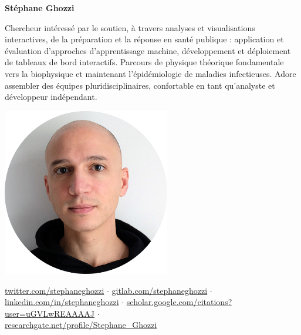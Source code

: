 \documentclass[a4paper,11pt,oneside]{article}
\begin{document}

\noindent\begin{minipage}{0.7\linewidth}
   \LARGE
   \noindent\textbf{Stéphane Ghozzi}

   \normalsize
   \vspace{1.5em}
   \noindent Chercheur intéressé par le soutien, à travers analyses et visualisations interactives, de la préparation et la réponse en santé publique : application et évaluation d'approches d'apprentissage machine, développement et déploiement de tableaux de bord interactifs. Parcours de physique théorique fondamentale vers la biophysique et maintenant l'épidémiologie de maladies infectieuses. Adore assembler des équipes pluridisciplinaires, confortable en tant qu'analyste et développeur indépendant.
\end{minipage}
\begin{minipage}{0.3\linewidth}
   \begin{center}
      \includegraphics[width=0.55\textwidth,right]{GHOZZI-Stephane-portrait-2020-cropped-circle-nobackground-lr.png}
   \end{center}
\end{minipage} 

\vspace{1em}

\href{https://twitter.com/stephaneghozzi}{twitter.com/stephaneghozzi} $\cdot$ \href{https://gitlab.com/stephaneghozzi}{gitlab.com/stephaneghozzi} $\cdot$ \\ \href{https://www.linkedin.com/in/stephaneghozzi}{linkedin.com/in/stephaneghozzi} $\cdot$ \href{https://scholar.google.com/citations?user=uGVLwREAAAAJ}{scholar.google.com/citations?user=uGVLwREAAAAJ} $\cdot$ \\
\href{https://www.researchgate.net/profile/Stephane\_Ghozzi}{researchgate.net/profile/Stephane\_Ghozzi}
\end{document}

